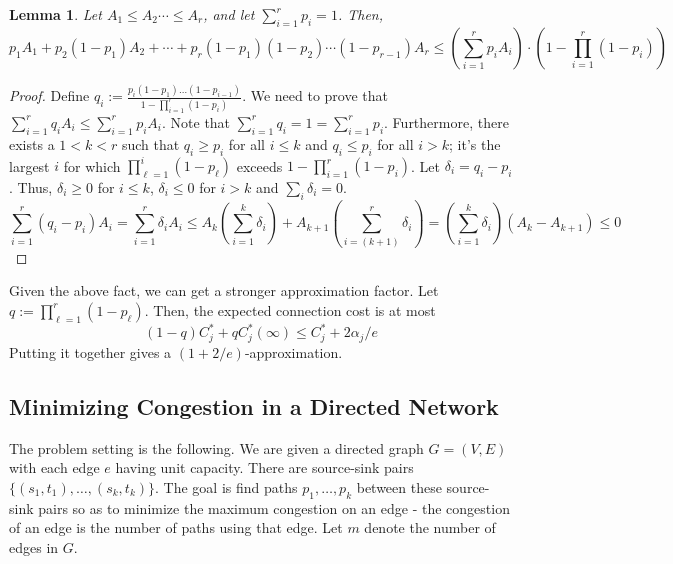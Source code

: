 \documentclass[11pt]{article}
\newtheorem{lemma}{Lemma}
\newtheorem{remark}{Remark}
\begin{document}
\begin{lemma}
Let $A_1 \le A_2 \cdots \le A_r$, and let $\sum_{i=1}^r p_i = 1$.
Then, 
$$p_1A_1 + p_2(1-p_1)A_2 + \cdots + p_r(1-p_1)(1-p_2)\cdots(1-p_{r-1})A_r \le \left(\sum_{i=1}^r p_iA_i\right)\cdot\left(1 - \prod_{i=1}^r(1-p_i)\right)$$
\end{lemma}
\begin{proof}
Define $q_i := \frac{p_i(1-p_1)\ldots(1-p_{i-1})}{1 - \prod_{i=1}^r(1-p_i)}$. We need to prove that 
$\sum_{i=1}^r q_iA_i \le \sum_{i=1}^r p_iA_i$. Note that $\sum_{i=1}^r q_i = 1 = \sum_{i=1}^r p_i$.
Furthermore, there exists a $1 < k < r$ such that $q_i \ge p_i$ for all $i\le k$ and $q_i \le p_i$ for all $i>k$;
it's the largest $i$ for which $\prod_{\ell=1}^i (1-p_\ell)$ exceeds $1 -  \prod_{i=1}^r(1-p_i)$.
Let $\delta_i = q_i - p_i$. Thus, $\delta_i \ge 0$ for $i\le k$, $\delta_i \le 0$ for $i>k$ and $\sum_i \delta_i = 0$.
$$\sum_{i=1}^r(q_i - p_i)A_i = \sum_{i=1}^r \delta_iA_i \le A_k\left(\sum_{i=1}^k \delta_i\right) + A_{k+1}\left(\sum_{i=(k+1)}^r\delta_i\right) =  \left(\sum_{i=1}^k \delta_i\right)(A_k - A_{k+1}) \le 0$$ 


\end{proof}
%
%
\noindent
Given the above fact, we can get a stronger approximation factor. Let $q := \prod_{\ell=1}^r(1-p_\ell)$. Then, the expected connection cost is at most 
$$(1- q)C^*_j + qC^*_j(\infty) \le C^*_j + 2\alpha_j/e$$
Putting it together gives a $(1+2/e)$-approximation.
\iffalse
\subsection*{Minimizing Congestion in a Directed Network}
The problem setting is the following. We are given a directed graph $G=(V,E)$ with each edge $e$ having unit capacity. There are source-sink pairs $\{(s_1,t_1),\ldots,(s_k,t_k)\}$.%
The goal is find paths $p_1,\ldots,p_k$ between these source-sink pairs so as to minimize the maximum congestion on an edge - the congestion of an edge is the number of paths using that edge. Let $m$ denote the number of edges in $G$.
\end{document}
